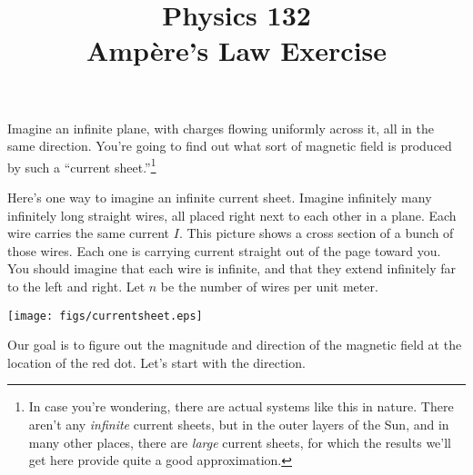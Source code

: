 \documentclass{article}
\begin{document}
\title{Physics 132\\
Amp\`ere's Law Exercise}
\maketitle


\bigskip\bigskip

Imagine an infinite plane, with charges flowing uniformly across it,
all in the same direction. You're going to find out what sort of
magnetic field is produced by such a ``current sheet.''\footnote{In
case you're wondering, there are actual systems like this in nature.
There aren't any \textit{infinite} current sheets, but in the outer
layers of the Sun, and in many other places, there are \textit{large}
current sheets, for which the results we'll get here provide quite a good
approximation.}

Here's one way to imagine an infinite current sheet. Imagine infinitely
many infinitely long straight wires, all placed right next to each other
in a plane. Each wire carries the same current $I$. This picture shows
a cross section of a bunch of those wires. Each one is carrying current
straight out of the page toward you. You should imagine that each wire
is infinite, and that they extend infinitely far to the left and right.
Let $n$ be the number of wires per unit meter.

\bigskip\bigskip

\centerline{\texttt{[image: figs/currentsheet.eps]}}

\bigskip\bigskip

Our goal is to figure out the magnitude and direction of the magnetic field
at the location of the red dot.
Let's start with the direction. 
\end{document}
